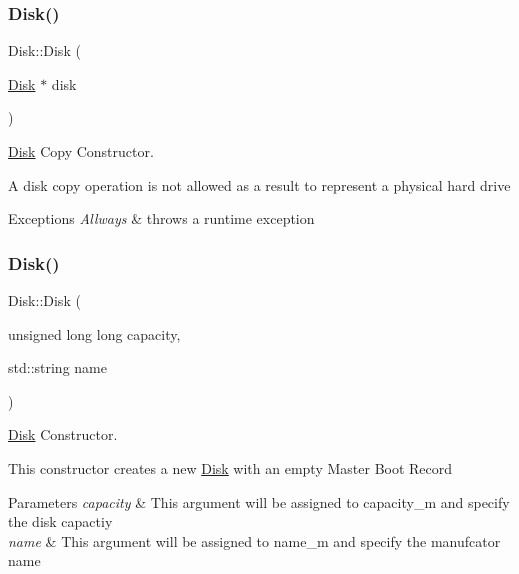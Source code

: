 \subsubsection{\texorpdfstring{Disk()}{Disk()}\hspace{0.1cm}{\footnotesize\ttfamily [2/4]}}
{\footnotesize\ttfamily Disk\+::\+Disk (\begin{DoxyParamCaption}\item[{\mbox{\hyperlink{classdisk_1_1_disk}{Disk}} $\ast$}]{disk }\end{DoxyParamCaption})\hspace{0.3cm}{\ttfamily [private]}}



\mbox{\hyperlink{classdisk_1_1_disk}{Disk}} Copy Constructor. 

A disk copy operation is not allowed as a result to represent a physical hard drive 
\begin{DoxyExceptions}{Exceptions}
{\em Allways} & throws a runtime exception \\
\hline
\end{DoxyExceptions}
\mbox{\label{classdisk_1_1_disk_a1531676df8b095dc6e818458aebf9dee}} 
\subsubsection{\texorpdfstring{Disk()}{Disk()}\hspace{0.1cm}{\footnotesize\ttfamily [3/4]}}
{\footnotesize\ttfamily Disk\+::\+Disk (\begin{DoxyParamCaption}\item[{unsigned long long}]{capacity,  }\item[{std\+::string}]{name }\end{DoxyParamCaption})}



\mbox{\hyperlink{classdisk_1_1_disk}{Disk}} Constructor. 

This constructor creates a new \mbox{\hyperlink{classdisk_1_1_disk}{Disk}} with an empty Master Boot Record 
\begin{DoxyParams}{Parameters}
{\em capacity} & This argument will be assigned to capacity\+\_\+m and specify the disk capactiy \\
\hline
{\em name} & This argument will be assigned to name\+\_\+m and specify the manufcator name \\
\hline
\end{DoxyParams}
\mbox{\label{classdisk_1_1_disk_ad7164897c3af79602e86463065550754}} 
